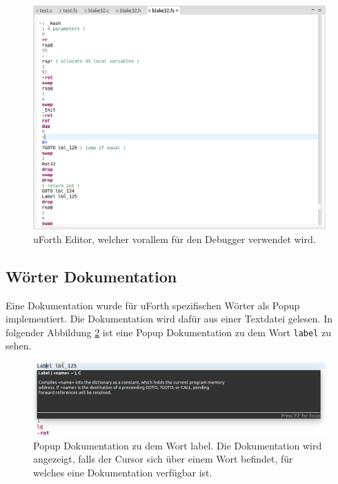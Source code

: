 \begin{figure}[H]
	\centering
		\includegraphics[scale=0.4]{fortheditor/fortheditor.png}
		\caption{uForth Editor, welcher vorallem für den Debugger verwendet wird.}
		\label{fig:fortheditor}
\end{figure}

\newpage

\subsection{Wörter Dokumentation}
Eine Dokumentation wurde für uForth spezifischen Wörter als Popup implementiert. Die Dokumentation wird dafür aus einer Textdatei gelesen. In folgender Abbildung \ref{fig:docpopup} ist eine Popup Dokumentation zu dem Wort \verb!label! zu sehen.

\begin{figure}[H]
	\centering
		\includegraphics[scale=0.4]{fortheditor/doc.png}
		\caption{Popup Dokumentation zu dem Wort label. Die Dokumentation wird angezeigt, falls der Cursor sich über einem Wort befindet, für welches eine Dokumentation verfügbar ist.}
		\label{fig:docpopup}
\end{figure}

